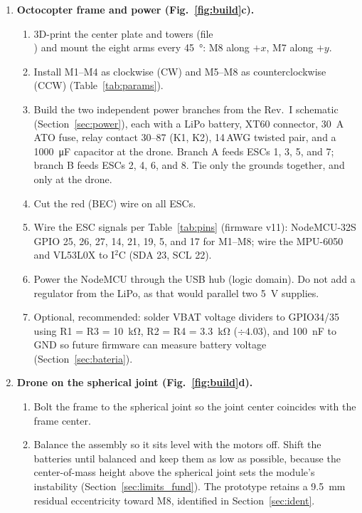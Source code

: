 \begin{enumerate}[label=\textbf{Step \arabic*.}, leftmargin=*, align=left]
  \item \textbf{Octocopter frame and power (Fig.~\ref{fig:build}c).}
  \begin{enumerate}[label=(\alph*)]
    \item 3D-print the center plate and towers (file\\ ) and mount the eight arms every \SI{45}{\degree}: M8 along $+x$, M7 along $+y$.
    \item Install M1--M4 as clockwise (CW) and M5--M8 as counterclockwise (CCW) (Table~\ref{tab:params}).
    \item Build the two independent power branches from the Rev.~I schematic (Section~\ref{sec:power}), each with a LiPo battery, XT60 connector, \SI{30}{\ampere} ATO fuse, relay contact 30--87 (K1, K2), 14\,AWG twisted pair, and a \SI{1000}{\micro\farad} capacitor at the drone. Branch A feeds ESCs 1, 3, 5, and 7; branch B feeds ESCs 2, 4, 6, and 8. Tie only the grounds together, and only at the drone.
    \item Cut the red (BEC) wire on all ESCs.
    \item Wire the ESC signals per Table~\ref{tab:pins} (firmware v11): NodeMCU-32S GPIO 25, 26, 27, 14, 21, 19, 5, and 17 for M1--M8; wire the MPU-6050 and VL53L0X to I$^2$C (SDA 23, SCL 22).
    \item Power the NodeMCU through the USB hub (logic domain). Do not add a regulator from the LiPo, as that would parallel two \SI{5}{\volt} supplies.
    \item Optional, recommended: solder VBAT voltage dividers to GPIO34/35 using R1 = R3 = \SI{10}{\kilo\ohm}, R2 = R4 = \SI{3.3}{\kilo\ohm} ($\div4.03$), and \SI{100}{\nano\farad} to GND so future firmware can measure battery voltage (Section~\ref{sec:bateria}).
  \end{enumerate}

  \item \textbf{Drone on the spherical joint (Fig.~\ref{fig:build}d).}
  \begin{enumerate}[label=(\alph*)]
    \item Bolt the frame to the spherical joint so the joint center coincides with the frame center.
    \item Balance the assembly so it sits level with the motors off. Shift the batteries until balanced and keep them as low as possible, because the center-of-mass height above the spherical joint sets the module's instability (Section~\ref{sec:limits_fund}). The prototype retains a \SI{9.5}{\milli\metre} residual eccentricity toward M8, identified in Section~\ref{sec:ident}.
  \end{enumerate}


\end{enumerate}
